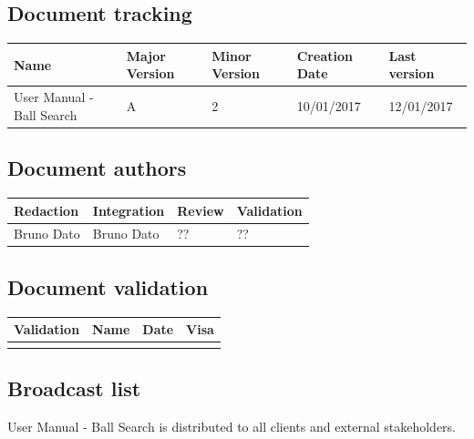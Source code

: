 \documentclass[10pt,a4paper]{article}
\begin{document}
\newpage


\subsection*{Document tracking}

\begin{center}
    \begin{tabular}{| l | l | l | l | l |}
    \hline
     \rowcolor{gray} Name & Major Version & Minor Version & Creation Date & Last version \\ \hline
    User Manual - Ball Search & A & 2 & 10/01/2017 & 12/01/2017 \\ \hline
    \end{tabular}
\end{center}


\subsection*{Document authors}

\begin{center}
    \begin{tabular}{| l | l | l | l |}
    \hline
    \rowcolor{gray} Redaction & Integration & Review & Validation \\ \hline
    Bruno Dato & Bruno Dato & ?? & ?? \\  \hline
    \end{tabular}
\end{center}

\subsection*{Document validation}

\begin{center}
    \begin{tabular}{| l | l | l | l |}
    \hline
     \rowcolor{gray} Validation & Name & Date & Visa \\ \hline
    & & & \\
     \hline
    \end{tabular}
\end{center}

\subsection*{Broadcast list}

User Manual - Ball Search is distributed to all clients and external stakeholders.
\end{document}
